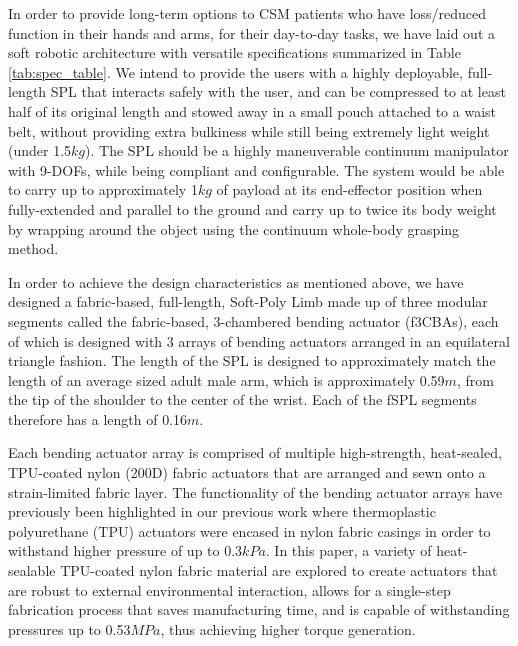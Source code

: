 \documentclass[letterpaper, 10 pt, conference]{ieeeconf}  %
\begin{document}
In order to provide long-term options to CSM patients who have loss/reduced function in their hands and arms, for their day-to-day tasks, we have laid out a soft robotic architecture with versatile specifications summarized in Table \ref{tab:spec_table}. We intend to provide the users with a highly deployable, full-length SPL that interacts safely with the user, and can be compressed to at least half of its original length and stowed away in a small pouch attached to a waist belt, without providing extra bulkiness while still being extremely light weight (under 1.5$kg$). The SPL should be a highly maneuverable continuum manipulator with 9-DOFs, while being compliant and configurable. The system would be able to carry up to approximately 1$kg$ of payload at its end-effector position when fully-extended and parallel to the ground and carry up to twice its body weight by wrapping around the object using the continuum whole-body grasping method. 

In order to achieve the design characteristics as mentioned above, we have designed a fabric-based, full-length, Soft-Poly Limb made up of three modular segments called the fabric-based, 3-chambered bending actuator (f3CBAs), each of which is designed with 3 arrays of bending actuators arranged in an equilateral triangle fashion. The length of the SPL is designed to approximately match the length of an average sized adult male arm, which is approximately 0.59$m$, from the tip of the shoulder to the center of the wrist. Each of the fSPL segments therefore has a length of 0.16$m$. 

Each bending actuator array is comprised of multiple high-strength, heat-sealed, TPU-coated nylon (200D) fabric actuators that are arranged and sewn onto a strain-limited fabric layer. The functionality of the bending actuator arrays have previously been highlighted in our previous work \cite{thalman2018} where thermoplastic polyurethane (TPU) actuators were encased in nylon fabric casings in order to withstand higher pressure of up to 0.3$kPa$. In this paper, a variety of heat-sealable TPU-coated nylon fabric material are explored to create actuators that are robust to external environmental interaction, allows for a single-step fabrication process that saves manufacturing time, and is capable of withstanding pressures up to 0.53$MPa$, thus achieving higher torque generation.
\end{document}
